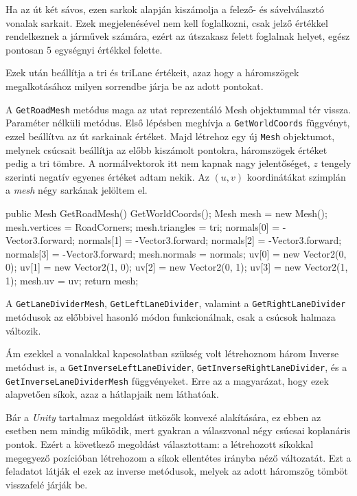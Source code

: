 Ha az út két sávos, ezen sarkok alapján kiszámolja a felező- és sávelválasztó vonalak sarkait. Ezek megjelenésével nem kell foglalkozni, csak jelző értékkel rendelkeznek a járművek számára, ezért az útszakasz felett foglalnak helyet, egész pontosan 5 egységnyi értékkel felette.

Ezek után beállítja a tri és triLane értékeit, azaz hogy a háromszögek megalkotásához milyen sorrendbe járja be az adott pontokat.


A \texttt{GetRoadMesh} metódus maga az utat reprezentáló Mesh objektummal tér vissza. Paraméter nélküli metódus. Első lépésben meghívja a \texttt{GetWorldCoords} függvényt, ezzel beállítva az út sarkainak értéket. Majd létrehoz egy új \texttt{Mesh} objektumot, melynek csúcsait beállítja az előbb kiszámolt pontokra, háromszögek értéket pedig a tri tömbre. A normálvektorok itt nem kapnak nagy jelentőséget, $z$ tengely szerinti negatív egyenes értéket adtam nekik. Az $(u, v)$ koordinátákat szimplán a \textit{mesh} négy sarkának jelöltem el.
\begin{cpp}
public Mesh GetRoadMesh()
        {
            GetWorldCoords();
            Mesh mesh = new Mesh();
            mesh.vertices = RoadCorners;
            mesh.triangles = tri;
            normals[0] = -Vector3.forward;
            normals[1] = -Vector3.forward;
            normals[2] = -Vector3.forward;
            normals[3] = -Vector3.forward;
            mesh.normals = normals;
            uv[0] = new Vector2(0, 0);
            uv[1] = new Vector2(1, 0);
            uv[2] = new Vector2(0, 1);
            uv[3] = new Vector2(1, 1);
            mesh.uv = uv;
            return mesh;
        }
\end{cpp}
A \texttt{GetLaneDividerMesh}, \texttt{GetLeftLaneDivider}, valamint a \texttt{GetRightLaneDivider} metódusok az előbbivel hasonló módon funkcionálnak, csak a csúcsok halmaza változik.

Ám ezekkel a vonalakkal kapcsolatban szükség volt létrehoznom három Inverse metódust is, a \texttt{GetInverseLeftLaneDivider}, \texttt{GetInverseRightLaneDivider}, és a \\
\texttt{GetInverseLaneDividerMesh} függvényeket. Erre az a magyarázat, hogy ezek alapvetően síkok, azaz a hátlapjaik nem láthatóak. 

Bár a \textit{Unity} tartalmaz megoldást ütközők konvexé alakítására, ez ebben az esetben nem mindig működik, mert gyakran a válaszvonal négy csúcsai koplanáris pontok. Ezért a következő megoldást választottam: a létrehozott síkokkal megegyező pozícióban létrehozom a síkok ellentétes irányba néző változatát. Ezt a feladatot látják el ezek az inverse metódusok, melyek az adott háromszög tömböt visszafelé járják be.

